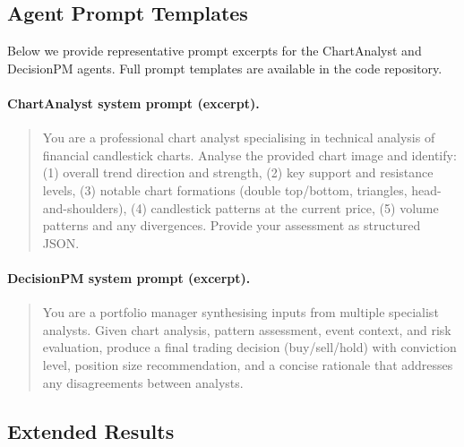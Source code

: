 \subsection{Agent Prompt Templates}
\label{app:prompts}

Below we provide representative prompt excerpts for the ChartAnalyst and DecisionPM agents. Full prompt templates are available in the code repository.

\paragraph{ChartAnalyst system prompt (excerpt).}
\begin{quote}
\small
You are a professional chart analyst specialising in technical analysis of financial candlestick charts. Analyse the provided chart image and identify: (1) overall trend direction and strength, (2) key support and resistance levels, (3) notable chart formations (double top/bottom, triangles, head-and-shoulders), (4) candlestick patterns at the current price, (5) volume patterns and any divergences. Provide your assessment as structured JSON.
\end{quote}

\paragraph{DecisionPM system prompt (excerpt).}
\begin{quote}
\small
You are a portfolio manager synthesising inputs from multiple specialist analysts. Given chart analysis, pattern assessment, event context, and risk evaluation, produce a final trading decision (buy/sell/hold) with conviction level, position size recommendation, and a concise rationale that addresses any disagreements between analysts.
\end{quote}

\subsection{Extended Results}
\label{app:extended}


